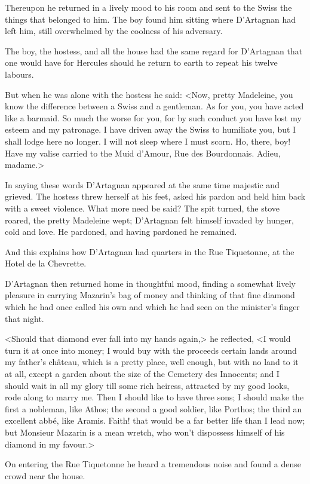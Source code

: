 Thereupon he returned in a lively mood to his room and sent to the Swiss the things that belonged to him. The boy found him sitting where D'Artagnan had left him, still overwhelmed by the coolness of his adversary.

The boy, the hostess, and all the house had the same regard for D'Artagnan that one would have for Hercules should he return to earth to repeat his twelve labours.

But when he was alone with the hostess he said: <Now, pretty Madeleine, you know the difference between a Swiss and a gentleman. As for you, you have acted like a barmaid. So much the worse for you, for by such conduct you have lost my esteem and my patronage. I have driven away the Swiss to humiliate you, but I shall lodge here no longer. I will not sleep where I must scorn. Ho, there, boy! Have my valise carried to the Muid d'Amour, Rue des Bourdonnais. Adieu, madame.>

In saying these words D'Artagnan appeared at the same time majestic and grieved. The hostess threw herself at his feet, asked his pardon and held him back with a sweet violence. What more need be said? The spit turned, the stove roared, the pretty Madeleine wept; D'Artagnan felt himself invaded by hunger, cold and love. He pardoned, and having pardoned he remained.

And this explains how D'Artagnan had quarters in the Rue Tiquetonne, at the Hotel de la Chevrette.

D'Artagnan then returned home in thoughtful mood, finding a somewhat lively pleasure in carrying Mazarin's bag of money and thinking of that fine diamond which he had once called his own and which he had seen on the minister's finger that night.

<Should that diamond ever fall into my hands again,> he reflected, <I would turn it at once into money; I would buy with the proceeds certain lands around my father's château, which is a pretty place, well enough, but with no land to it at all, except a garden about the size of the Cemetery des Innocents; and I should wait in all my glory till some rich heiress, attracted by my good looks, rode along to marry me. Then I should like to have three sons; I should make the first a nobleman, like Athos; the second a good soldier, like Porthos; the third an excellent abbé, like Aramis. Faith! that would be a far better life than I lead now; but Monsieur Mazarin is a mean wretch, who won't dispossess himself of his diamond in my favour.>

On entering the Rue Tiquetonne he heard a tremendous noise and found a dense crowd near the house.

